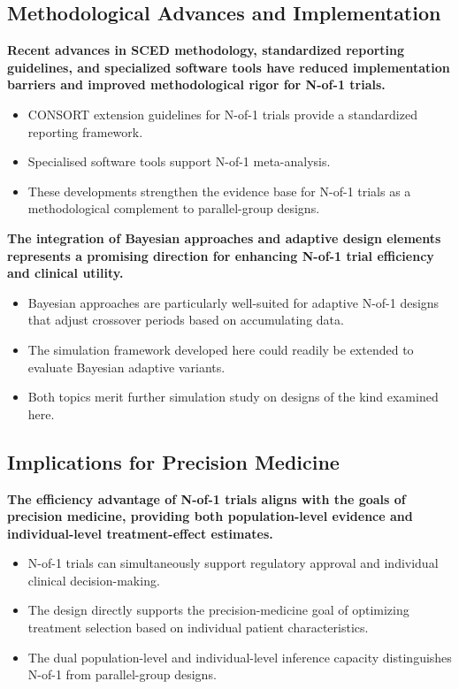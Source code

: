 \documentclass[
  11pt,
]{article}
\begin{document}
\subsection{Methodological Advances and Implementation}\label{methodological-advances-and-implementation}

\textbf{Recent advances in SCED methodology, standardized reporting guidelines, and specialized software tools have reduced implementation barriers and improved methodological rigor for N-of-1 trials.}

\begin{itemize}\setlength{\itemsep}{2pt}\setlength{\parskip}{0pt}
\item CONSORT extension guidelines for N-of-1 trials provide a standardized reporting framework.
\item Specialised software tools support N-of-1 meta-analysis.
\item These developments strengthen the evidence base for N-of-1 trials as a methodological complement to parallel-group designs.
\end{itemize}

\textbf{The integration of Bayesian approaches and adaptive design elements represents a promising direction for enhancing N-of-1 trial efficiency and clinical utility.}

\begin{itemize}\setlength{\itemsep}{2pt}\setlength{\parskip}{0pt}
\item Bayesian approaches are particularly well-suited for adaptive N-of-1 designs that adjust crossover periods based on accumulating data.
\item The simulation framework developed here could readily be extended to evaluate Bayesian adaptive variants.
\item Both topics merit further simulation study on designs of the kind examined here.
\end{itemize}

\subsection{Implications for Precision Medicine}\label{implications-for-precision-medicine}

\textbf{The efficiency advantage of N-of-1 trials aligns with the goals of precision medicine, providing both population-level evidence and individual-level treatment-effect estimates.}

\begin{itemize}\setlength{\itemsep}{2pt}\setlength{\parskip}{0pt}
\item N-of-1 trials can simultaneously support regulatory approval and individual clinical decision-making.
\item The design directly supports the precision-medicine goal of optimizing treatment selection based on individual patient characteristics.
\item The dual population-level and individual-level inference capacity distinguishes N-of-1 from parallel-group designs.
\end{itemize}
\end{document}
